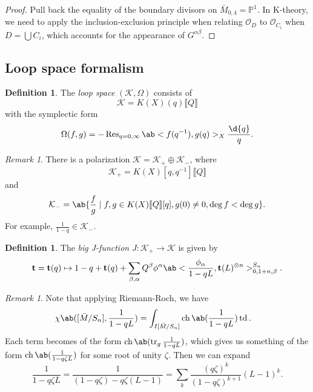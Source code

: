 \documentclass{amsart}
\theoremstyle{definition}
\newtheorem{defn}[thm]{Definition}
\theoremstyle{remark}
\newtheorem{rmk}[thm]{Remark}
\theoremstyle{plain}
\theoremstyle{definition}
\theoremstyle{remark}
\renewcommand{\P}{\mathbb{P}}
\newcommand{\mc}[1]{\mathcal{#1}}
\newcommand{\on}[1]{\operatorname{#1}}
\newcommand{\1}{\mathbf{1}}
\newcommand{\2}{\mathbf{2}}
\newcommand{\3}{\mathbf{3}}
\newcommand{\ps}[1]{\llbracket #1 \rrbracket}
\begin{document}
\begin{proof}
    Pull back the equality of the boundary divisors on \(\bar{M}_{0,4} = \P^1\). In K-theory, we need to apply the inclusion-exclusion principle when relating \(\mc{O}_D\) to \(\mc{O}_{C_i}\) when \(D = \bigcup C_i\), which accounts for the appearance of \(G^{\alpha\beta}\).
\end{proof}

\subsection{Loop space formalism}%
\label{sub:Loop space formalism}

\begin{defn}
    The \textit{loop space} \((\mc{K}, \Omega)\) consists of 
    \[ \mc{K} = K(X)(q) \ps{Q}\]
    with the symplectic form
    \[ \Omega(f, g) = - \on{Res}_{q = 0, \infty} \ab<f(q^{-1}), g(q)>_X \frac{\d{q}}{q}. \]
\end{defn}

\begin{rmk}
    There is a polarization \(\mc{K} = \mc{K}_+ \oplus \mc{K}_-\), where
    \[ \mc{K}_+ = K(X)[q, q^{-1}]\ps{Q} \]
    and
    \[ \mc{K}_- = \ab\{ \frac{f}{g} \mid f, g \in K(X)\ps{Q}[q], g(0) \neq 0, \deg f < \deg g\}. \]
    For example, \(\frac{1}{1-q} \in \mc{K}_-\).
\end{rmk}

\begin{defn}
    The \textit{big J-function} \(J \colon \mc{K}_+ \to \mc{K}\) is given by
    \[ \mathbf{t} = \mathbf{t}(q) \mapsto 1 - q + \mathbf{t}(q) + \sum_{\beta, \alpha} Q^{\beta} \phi^{\alpha} \ab< \frac{\phi_{\alpha}}{1-qL}, \mathbf{t}(L)^{\otimes n}>_{0, 1+n, \beta}^{S_n}. \]
\end{defn}

\begin{rmk}
    Note that applying Riemann-Roch, we have
    \begin{align*}
        \chi\ab([\bar{M}/S_n], \frac{1}{1-qL}) &= \int_{I[\bar{M}/S_n]} \on{ch}\ab(\frac{1}{1-qL}) \on{td}.
    \end{align*}
    Each term becomes of the form \(\on{ch}\ab(\on{tr}_g \frac{1}{1-qL})\), which gives us something of the form \(\on{ch}\ab(\frac{1}{1-q\zeta L})\) for some root of unity \(\zeta\). Then we can expand
    \[ \frac{1}{1-q\zeta L} = \frac{1}{(1-q \zeta) - q\zeta (L-1)} = \sum_k \frac{(q\zeta)^k}{(1-q\zeta)^{k+1}}(L-1)^k. \]
\end{rmk}
\end{document}
